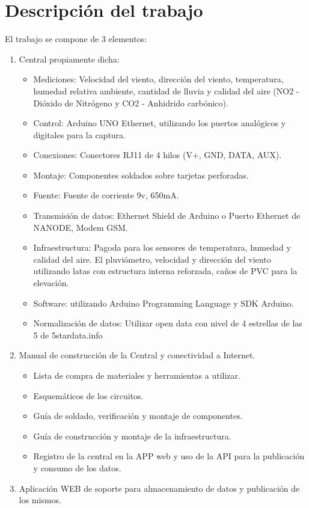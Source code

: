 \documentclass[a4paper,11pt, spanish]{article}
\begin{document}
\section{Descripción del trabajo}
El trabajo se compone de 3 elementos:
\begin{enumerate}
\item Central propiamente dicha:
\begin{itemize}
\item Mediciones: Velocidad del viento, dirección del viento, temperatura, humedad relativa ambiente, cantidad de lluvia y calidad del aire (NO2 - Dióxido de Nitrógeno y CO2 - Anhidrido carbónico).
\item Control: Arduino UNO Ethernet, utilizando los puertos analógicos y digitales para la captura.
\item Conexiones: Conectores RJ11 de 4 hilos (V+, GND, DATA, AUX).
\item Montaje: Componentes soldados sobre tarjetas perforadas.
\item Fuente: Fuente de corriente 9v, 650mA.
\item Transmisión de datos: Ethernet Shield de Arduino o Puerto Ethernet de NANODE, Modem GSM.
\item Infraestructura: Pagoda para los sensores de temperatura, humedad y calidad del aire. El pluviómetro, velocidad y dirección del viento utilizando latas con estructura interna reforzada, caños de PVC para la elevación.
\item Software: utilizando Arduino Programming Language y SDK Arduino.
\item Normalización de datos: Utilizar open data con nivel de 4 estrellas de las 5 de 5stardata.info
\end{itemize}
\item Manual de construcción de la Central y conectividad a Internet.
\begin{itemize}
\item Lista de compra de materiales y herramientas a utilizar.
\item Esquemáticos de los circuitos.
\item Guía de soldado, verificación y montaje de componentes.
\item Guía de construcción y montaje de la infraestructura.
\item Registro de la central en la APP web y uso de la API para la publicación y consumo de los datos.
\end{itemize}
\item Aplicación WEB de soporte para almacenamiento de datos y publicación de los mismos.

\end{enumerate}
\end{document}
